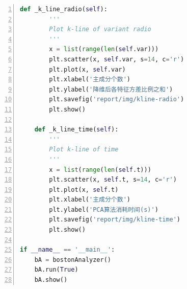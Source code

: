 \documentclass[12pt,a4paper]{article}
\theoremstyle{definition}
\begin{document}
\begin{appendix}
\begin{lstlisting}[language=Python,
	numbers=left,
	keywordstyle=\color{blue!70},
	frame=shadowbox,
	breaklines=True]
    def _k_line_radio(self):
        '''
        Plot k-line of variant radio
        '''
        x = list(range(len(self.var)))
        plt.scatter(x, self.var, s=14, c='r')
        plt.plot(x, self.var)
        plt.xlabel('主成分个数')
        plt.ylabel('降维后各特征方差比例之和')
        plt.savefig('report/img/kline-radio')
        plt.show()

    def _k_line_time(self):
        '''
        Plot k-line of time
        '''
        x = list(range(len(self.t)))
        plt.scatter(x, self.t, s=14, c='r')
        plt.plot(x, self.t)
        plt.xlabel('主成分个数')
        plt.ylabel('PCA算法消耗时间(s)')
        plt.savefig('report/img/kline-time')
        plt.show()

if __name__ == '__main__':
    bA = bostonAnalyzer()
    bA.run(True)
    bA.show()
	\end{lstlisting}
	
\end{appendix}

\end{document}
